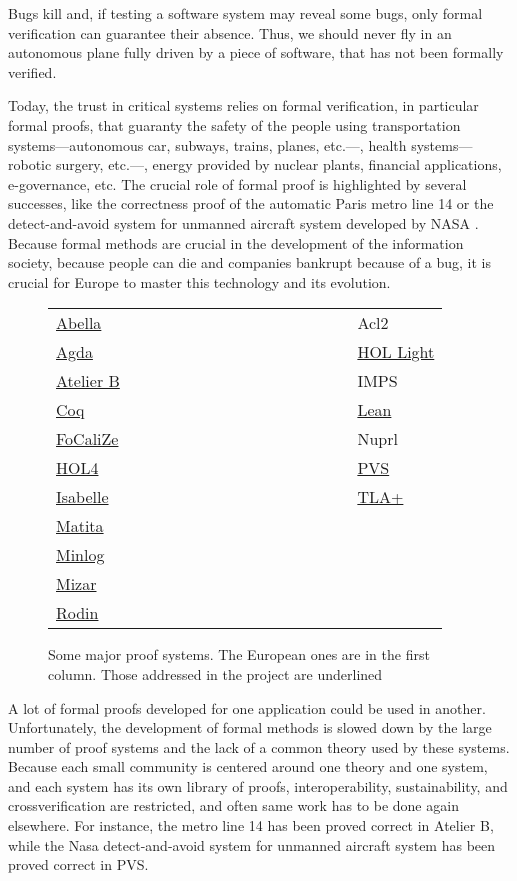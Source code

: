 Bugs kill and, if testing a software system may reveal some bugs, only
formal verification can guarantee their absence.  Thus, we should
never fly in an autonomous plane fully driven by a piece of software,
that has not been formally verified.

Today, the trust in critical systems relies on formal verification, in
particular formal proofs, that guaranty the safety of the people using
transportation systems---autonomous car, subways, trains, planes,
etc.---, health systems---robotic surgery, etc.---, energy provided by
nuclear plants, financial applications, e-governance, etc. The crucial
role of formal proof is highlighted by several successes, like the
correctness proof of the automatic Paris metro line 14 \cite{metro14}
or the detect-and-avoid system for unmanned aircraft system developed
by NASA \cite{Munoz16}.  Because formal methods are crucial in the
development of the information society, because people can die and
companies bankrupt because of a bug, it is crucial for Europe to
master this technology and its evolution.

\thispagestyle{empty}

\begin{figure}
\begin{tabular}{ll}
  {\sc \underline{Abella}}~~~~~~~~~~~~~~~~~~~~~~~~~~~~~~&{\sc Acl2}\\
{\sc \underline{Agda}} &  {\sc \underline{HOL Light}}\\
{\sc \underline{Atelier B}} &  {\sc IMPS}\\
{\sc \underline{Coq}}  &  {\sc \underline{Lean}}\\
{\sc \underline{FoCaliZe}}  &  {\sc Nuprl}\\
{\sc \underline{HOL4}}  &  {\sc \underline{PVS}}\\
{\sc \underline{Isabelle}}  &  {\sc \underline{TLA+}}\\
{\sc \underline{Matita}}\\
{\sc \underline{Minlog}}\\
{\sc \underline{Mizar}}\\
{\sc \underline{Rodin}}\\
\end{tabular}
\caption{Some major proof systems. The European ones are in the first column.
  Those addressed in the project are underlined\label{systems}}
\end{figure}

A lot of formal proofs developed for one application could be used in
another.  Unfortunately, the development of formal methods is slowed
down by the large number of proof systems and the lack of a common
theory used by these systems.  Because each small community is
centered around one theory and one system, and each system has its own
library of proofs, interoperability, sustainability, and
crossverification are restricted, and often same work has to be done
again elsewhere.  For instance, the metro line 14 has been proved
correct in {\sc Atelier B}, while the Nasa detect-and-avoid system for
unmanned aircraft system has been proved correct in {\sc PVS}.

